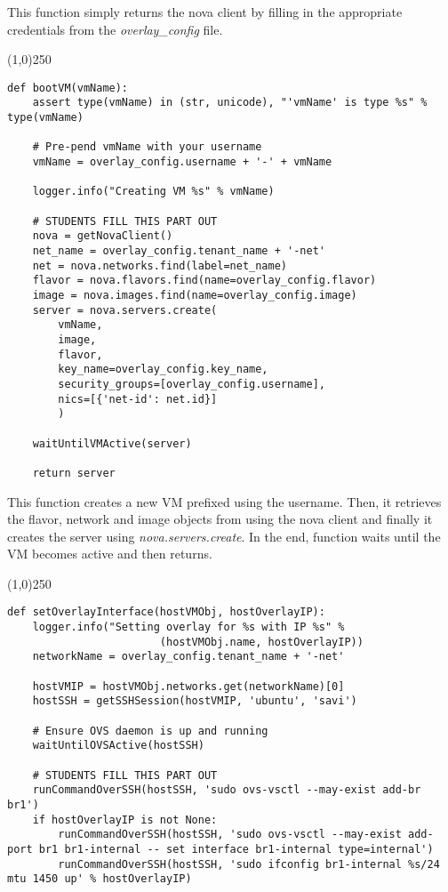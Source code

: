 \documentclass[12pt]{article}
\begin{document}
This function simply returns the nova client by filling in the appropriate credentials from the \textit{overlay\_config} file. \\

\begin{center}
	\line(1,0){250}
\end{center}

\begin{verbatim}
def bootVM(vmName):
    assert type(vmName) in (str, unicode), "'vmName' is type %s" % type(vmName)

    # Pre-pend vmName with your username
    vmName = overlay_config.username + '-' + vmName

    logger.info("Creating VM %s" % vmName)

    # STUDENTS FILL THIS PART OUT
    nova = getNovaClient()
    net_name = overlay_config.tenant_name + '-net'
    net = nova.networks.find(label=net_name)
    flavor = nova.flavors.find(name=overlay_config.flavor)
    image = nova.images.find(name=overlay_config.image)
    server = nova.servers.create(
        vmName,
        image,
        flavor,
        key_name=overlay_config.key_name,
        security_groups=[overlay_config.username],
        nics=[{'net-id': net.id}]
        )

    waitUntilVMActive(server)

    return server
\end{verbatim}

This function creates a new VM prefixed using the username. Then, it retrieves the flavor, network and image objects from using the nova client and finally it creates the server using \textit{nova.servers.create}. In the end, function waits until the VM becomes active and then returns.

\begin{center}
	\line(1,0){250}
\end{center}
\begin{verbatim}
def setOverlayInterface(hostVMObj, hostOverlayIP):
    logger.info("Setting overlay for %s with IP %s" %
                        (hostVMObj.name, hostOverlayIP))
    networkName = overlay_config.tenant_name + '-net'

    hostVMIP = hostVMObj.networks.get(networkName)[0]
    hostSSH = getSSHSession(hostVMIP, 'ubuntu', 'savi')

    # Ensure OVS daemon is up and running
    waitUntilOVSActive(hostSSH)

    # STUDENTS FILL THIS PART OUT
    runCommandOverSSH(hostSSH, 'sudo ovs-vsctl --may-exist add-br br1')
    if hostOverlayIP is not None:
        runCommandOverSSH(hostSSH, 'sudo ovs-vsctl --may-exist add-port br1 br1-internal -- set interface br1-internal type=internal')
        runCommandOverSSH(hostSSH, 'sudo ifconfig br1-internal %s/24 mtu 1450 up' % hostOverlayIP)
\end{verbatim}
\end{document}
